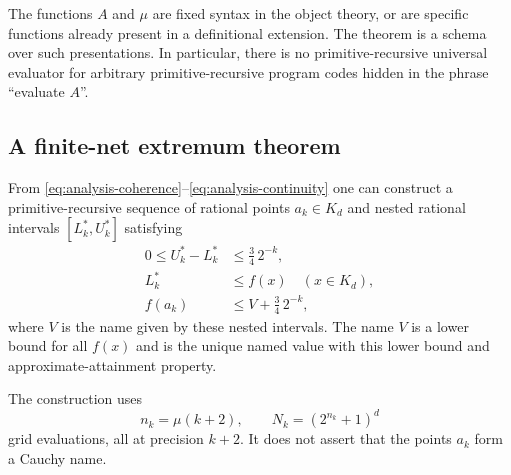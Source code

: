 The functions $A$ and $\mu$ are fixed syntax in the object theory, or are
specific functions already present in a definitional extension.  The
theorem is a schema over such presentations.  In particular, there is no
primitive-recursive universal evaluator for arbitrary primitive-recursive
program codes hidden in the phrase ``evaluate $A$''.

\subsection{A finite-net extremum theorem}

\begin{theorem}
\label{thm:finite-net-infimum}
From \eqref{eq:analysis-coherence}--\eqref{eq:analysis-continuity} one can
construct a primitive-recursive sequence of rational points $a_k\in K_d$
and nested rational intervals $[L^*_k,U^*_k]$ satisfying
\begin{align}
 0\le U^*_k-L^*_k&\le\tfrac34\,2^{-k},
       \label{eq:infimum-width}\\
 L^*_k&\le f(x)\quad(x\in K_d),
       \label{eq:infimum-lower}\\
 f(a_k)&\le V+\tfrac34\,2^{-k},
       \label{eq:approx-minimizer}
\end{align}
where $V$ is the name given by these nested intervals.  The name $V$ is a
lower bound for all $f(x)$ and is the unique named value with this lower
bound and approximate-attainment property.

The construction uses
\[
 n_k=\mu(k+2),\qquad
 N_k=(2^{n_k}+1)^d
\]
grid evaluations, all at precision $k+2$.  It does not assert that the
points $a_k$ form a Cauchy name.
\end{theorem}

